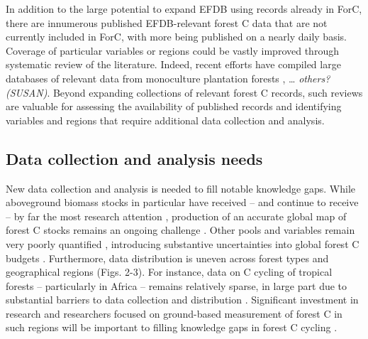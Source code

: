 \documentclass[, manuscript]{copernicus}
\begin{document}
In addition to the large potential to expand EFDB using records already
in ForC, there are innumerous published EFDB-relevant forest C data that
are not currently included in ForC, with more being published on a
nearly daily basis. Coverage of particular variables or regions could be
vastly improved through systematic review of the literature. Indeed,
recent efforts have compiled large databases of relevant data from
monoculture plantation forests \citep{bukoski_rates_2022}, \ldots{}
\emph{others? (SUSAN)}. Beyond expanding collections of relevant forest
C records, such reviews are valuable for assessing the availability of
published records and identifying variables and regions that require
additional data collection and analysis.

\subsection{Data collection and analysis needs}

New data collection and analysis is needed to fill notable knowledge
gaps. While aboveground biomass stocks in particular have received --
and continue to receive -- by far the most research attention
\citep[Table 2,][]{anderson-teixeira_carbon_2021}, production of an
accurate global map of forest C stocks remains an ongoing challenge
\citep{refs}. Other pools and variables remain very poorly quantified
\citep[Table 2,][]{anderson-teixeira_carbon_2021}, introducing
substantive uncertainties into global forest C budgets \citep{refs}.
Furthermore, data distribution is uneven across forest types and
geographical regions (Figs. 2-3). For instance, data on C cycling of
tropical forests -- particularly in Africa -- remains relatively sparse,
in large part due to substantial barriers to data collection and
distribution \citep{delima_making_2022}. Significant investment in
research and researchers focused on ground-based measurement of forest C
in such regions will be important to filling knowledge gaps in forest C
cycling \citep{delima_making_2022, refs}.
\end{document}
